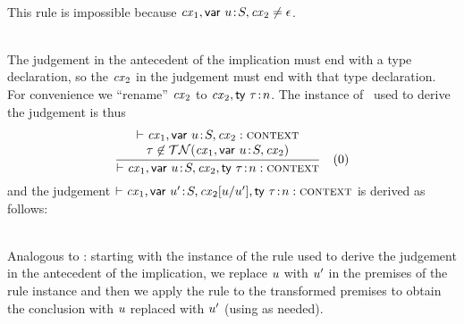 \begin{bycase}

\Case{\Rcxmt}\\
This rule is impossible because $\mathit{cx}_1,\mathsf{var}\ u\!:\!S,\mathit{cx}_2\neq\epsilon$.

\Case{\Rcxtdec}\\
The judgement in the antecedent of the implication must end with a type
declaration, so the $\mathit{cx}_2$ in the judgement must end with that type
declaration. For convenience we ``rename'' $\mathit{cx}_2$ to $\mathit{cx}_2,\mathsf{ty}\ \tau\!:\!n$.
The instance of \Rcxtdec\ used to derive the judgement is thus
\[
\rruleII
 {\cxwf{\cxv}}
 {\tnam\not\in\cxtnam{\cxv}}
 {\cxwf{\snoc{\cxv}{\tdecO}}}
 {0}
\]
and the judgement $\vdash\mathit{cx}_1,\mathsf{var}\ u'\!:\!S,\mathit{cx}_2[u/u'],\mathsf{ty}\ \tau\!:\!n:\textsc{context}$ is derived as follows:
\begin{derivation}
\steP
{\cxtnam{\cxv}
 \linK{=}
 \cup{}
 \cup{}
 \linK{=}
 \cxtnam{\cxvI}}
\end{derivation}

\Case{\Rcxodec, \Rcxax, \Rcxlem, \Rcxtvdec}\\
Analogous to \Rcxtdec: starting with the instance of the rule used to derive
the judgement in the antecedent of the implication, we replace $u$ with
$u'$ in the premises of the rule instance and then we apply the rule to
the transformed premises to obtain the conclusion with $u$ replaced with
$u'$ (using  as needed).


\end{bycase}
